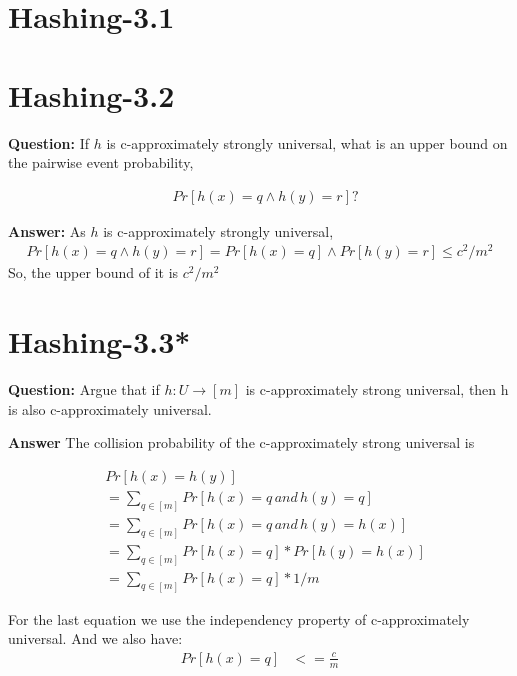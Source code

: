 \documentclass[12pt]{article}
\begin{document}

\section{Hashing-3.1}

\section{Hashing-3.2}
\textbf{Question: }
If $h$ is c-approximately strongly universal, what is an upper bound on the pairwise event probability,

\begin{align}
&Pr[h(x) = q \wedge h(y) = r]?
\end{align}

\textbf{Answer:}
As $h$ is c-approximately strongly universal, 
\begin{align}
    Pr[h(x) = q \wedge h(y) = r] = Pr[h(x) = q] \wedge Pr[h(y) = r]\leq c^2/m^2
\end{align}
So, the upper bound of it is $c^2/m^2$

\section{Hashing-3.3* }
\textbf{Question: }
Argue that if $h: U \rightarrow [m]$ is c-approximately strong universal, then h is also c-approximately universal.

\textbf{Answer}
The collision probability of the c-approximately strong universal is 

\begin{equation}
\begin{aligned}
&Pr[h(x)=h(y)] \\
&= \sum_{q \in [m]} Pr[h(x) = q \, and \, h(y) = q]\\
&= \sum_{q \in [m]} Pr[h(x) = q \, and \, h(y) = h(x)]\\
&=\sum_{q \in [m]} Pr[h(x) = q] * Pr[h(y) = h(x)]\\
&=\sum_{q \in [m]} Pr[h(x) = q] *1/m
\end{aligned}
\end{equation}

For the last equation we use the independency property of c-approximately universal. And we also have:
\begin{equation}
\begin{aligned}
Pr[h(x) = q] &<= \frac{c}{m} \\
\end{aligned}
\end{equation}
\end{document}
